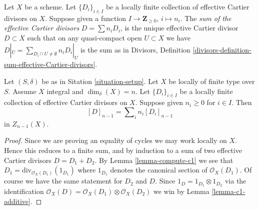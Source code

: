 \begin{definition}
\label{definition-locally-finite-sum-effective-Cartier-divisors}
Let $X$ be a scheme.
Let $\{D_i\}_{i \in I}$ be a locally finite collection
of effective Cartier divisors on $X$.
Suppose given a function
$I \to \mathbf{Z}_{\geq 0}$, $i \mapsto n_i$.
The {\it sum of the effective Cartier divisors}
$D = \sum n_i D_i$, is the unique effective Cartier divisor
$D \subset X$ such that on any quasi-compact open $U \subset X$
we have $D|_U = \sum_{D_i \cap U \not = \emptyset} n_iD_i|_U$
is the sum as in Divisors,
Definition \ref{divisors-definition-sum-effective-Cartier-divisors}.
\end{definition}

\begin{lemma}
\label{lemma-sum-divisors-associated-Weil}
Let $(S, \delta)$ be as in Sitation \ref{situation-setup}.
Let $X$ be locally of finite type over $S$.
Assume $X$ integral and $\dim_\delta(X) = n$.
Let $\{D_i\}_{i \in I}$ be a locally finite collection
of effective Cartier divisors on $X$.
Suppose given $n_i \geq 0$ for $i \in I$.
Then
$$
[D]_{n - 1} = \sum\nolimits_i n_i[D_i]_{n - 1}
$$
in $Z_{n - 1}(X)$.
\end{lemma}

\begin{proof}
Since we are proving an equality of cycles we may work locally on $X$.
Hence this reduces to a finite sum, and by induction to a sum of
two effective Cartier divisors $D = D_1 + D_2$.
By Lemma \ref{lemma-compute-c1} we see that
$D_1 = \text{div}_{\mathcal{O}_X(D_1)}(1_{D_1})$ where
$1_{D_1}$ denotes the canonical section of $\mathcal{O}_X(D_1)$.
Of course we have the same statement for $D_2$ and $D$.
Since $1_D = 1_{D_1} \otimes 1_{D_2}$ via the identification
$\mathcal{O}_X(D) = \mathcal{O}_X(D_1) \otimes \mathcal{O}_X(D_2)$
we win by Lemma \ref{lemma-c1-additive}.
\end{proof}

